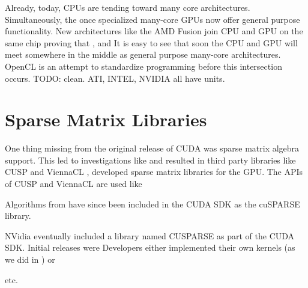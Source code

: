 \documentclass{report}
\begin{document}

 Already, today, CPUs are tending toward many core architectures. Simultaneously, the once specialized many-core GPUs now offer general purpose functionality. New architectures like the AMD Fusion \cite{AMDFusion} join CPU and GPU on the same chip proving that 
, and It is easy to see that soon the CPU and GPU will meet somewhere in the middle as general purpose many-core architectures. OpenCL is an attempt to standardize programming before this intersection occurs. 
TODO: clean. ATI, INTEL, NVIDIA all have units. 

\section{Sparse Matrix Libraries}

One thing missing from the original release of CUDA was sparse matrix algebra support. 
This led to investigations like \cite{Bell2009,SuKeutzer2012} and resulted in third party libraries like CUSP \cite{Cusp2012} and ViennaCL \cite{Rupp2010,Rupp2010a}, developed sparse matrix libraries for the GPU. The APIs of CUSP and ViennaCL are used like 

Algorithms from \cite{Bell2009} have since been included in the CUDA SDK as the cuSPARSE library. 

NVidia eventually included a library named CUSPARSE as part of the CUDA SDK. Initial releases were 
Developers either implemented their own kernels (as we did in \cite{BolligFlyerErlebacher2012}) or   






 



\cite{Bell2009} 
\cite{Vuduc2005} etc. 
\end{document}
